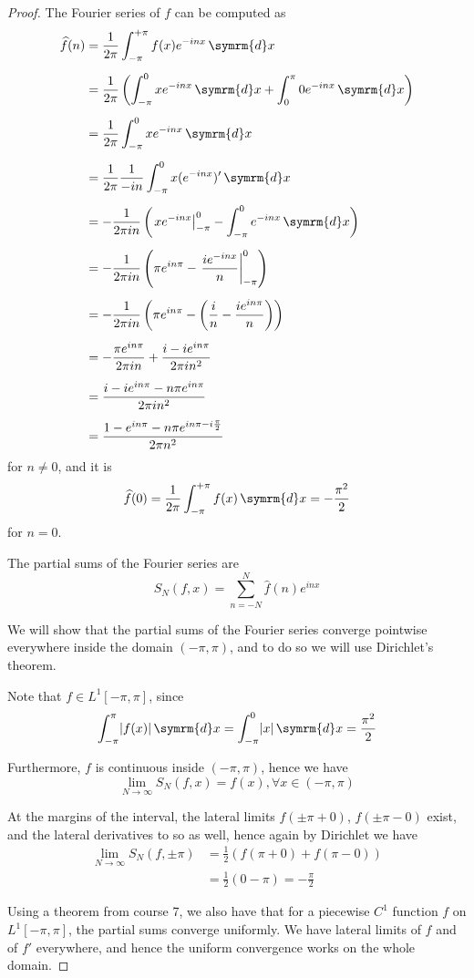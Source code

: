 \documentclass[a4paper, 12pt]{article}
\DeclarePairedDelimiter\abs{\lvert}{\rvert}%
\newcommand*\diff{\mathop{}\!\symrm{d}}
\begin{document}
\begin{proof}
The Fourier series of \(f\) can be computed as
\begin{align*}
    \widehat{f}(n) &= \frac{1}{2\pi} \int_{-\pi}^{+\pi} f(x) e^{-i n x} \diff x \\[0.5em]
    &= \frac{1}{2\pi} \left(\int_{-\pi}^0 x e^{-inx} \diff x + \int_{0}^{\pi} 0 e^{-inx} \diff x \right) \\[0.5em]
    &= \frac{1}{2\pi} \int_{-\pi}^{0} x e^{-inx} \diff x \\[0.5em]
    &= \frac{1}{2\pi} \frac{1}{-in} \int_{-\pi}^{0} x (e^{-inx})' \diff x \\[0.5em]
    &= - \frac{1}{2\pi i n} \left(\left.x e^{-inx}\right|_{-\pi}^{0} - \int_{-\pi}^{0} e^{-inx} \diff x\right) \\[0.5em]
    &= - \frac{1}{2\pi i n} \left(\pi e^{i n \pi} - \left.\frac{i e^{-i n x}}{n}\right|_{-\pi}^{0} \right) \\[0.5em]
    &= - \frac{1}{2 \pi i n} \left(\pi e^{i n \pi} - \left(\frac{i}{n} - \frac{i e^{in \pi}}{n}\right)\right) \\[0.5em]
    &= -\frac{\pi e^{in\pi}}{2\pi i n} + \frac{i - i e^{i n \pi}}{2\pi i n^2} \\[0.5em]
    &= \frac{i - i e^{in\pi} - n \pi e^{in\pi}}{2\pi i n^2} \\[0.5em]
    &= \frac{1 - e^{in\pi} - n \pi e^{in\pi - i \frac{\pi}{2}}}{2 \pi n^2}
\end{align*}
for \(n \neq 0\), and it is
\[
    \widehat{f}(0) = \frac{1}{2\pi} \int_{-\pi}^{+\pi} f(x) \diff x = -\frac{\pi^2}{2}
\]
for \(n = 0\).

The partial sums of the Fourier series are
\[
    S_N (f, x) = \sum_{n = -N}^{N} \widehat{f}(n) e^{i n x}
\]

We will show that the partial sums of the Fourier series converge pointwise everywhere inside the domain \((-\pi, \pi)\), and to do so we will use Dirichlet's theorem.

Note that \(f \in L^1 [-\pi, \pi]\), since
\[
    \int_{-\pi}^{\pi} \abs{f(x)} \diff x = \int_{-\pi}^{0} \abs{x} \diff x = \frac{\pi^2}{2}
\]

Furthermore, \(f\) is continuous inside \((-\pi, \pi)\), hence we have
\[
    \lim_{N \to \infty} S_N (f, x) = f(x), \forall x \in (-\pi, \pi)
\]

At the margins of the interval, the lateral limits \(f(\pm \pi + 0)\), \(f(\pm \pi - 0)\) exist, and the lateral derivatives to so as well, hence again by Dirichlet we have
\begin{align*}
    \lim_{N \to \infty} S_N (f, \pm \pi) &= \frac{1}{2} (f(\pi + 0) + f(\pi - 0)) \\
    &= \frac{1}{2} (0 - \pi) = - \frac{\pi}{2}
\end{align*}

Using a theorem from course 7, we also have that for a piecewise \(C^1\) function \(f\) on \(L^1 [-\pi, \pi]\), the partial sums converge uniformly. We have lateral limits of \(f\) and of \(f'\) everywhere, and hence the uniform convergence works on the whole domain.
\end{proof}
\end{document}
